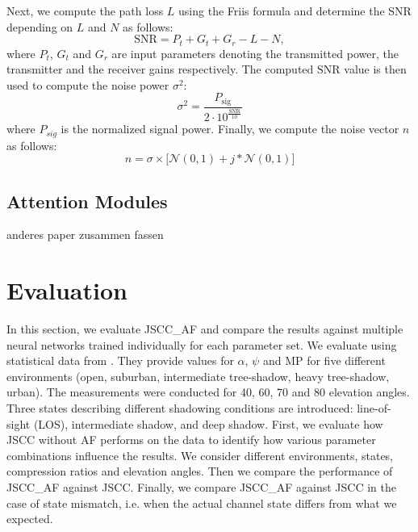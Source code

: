 \documentclass[conference]{IEEEtran}
\begin{document}
Next, we compute the path loss $L$ using the Friis formula \cite{} and determine the SNR depending on $L$ and $N$ as follows:
%
\begin{equation}
  \mathrm{SNR} = P_t + G_t + G_r - L - N,
\end{equation}
%
where $P_t$, $G_t$ and $G_r$ are input parameters denoting the transmitted power, the transmitter and the receiver gains respectively. 
The computed $\mathrm{SNR}$ value is then used to compute the noise power $\sigma^2$:
%
\begin{equation}
  \sigma^2 = \frac{P_{\mathrm{sig}}}{2 \cdot 10^{\frac{\mathrm{SNR}}{10}}}
\end{equation}
%
where $P_{sig}$ is the normalized signal power.
Finally, we compute the noise vector $n$ as follows:
%
\begin{equation}
  n = \sigma \times \bigl[\mathcal{N}(0,1) + j * \mathcal{N}(0,1) \bigr] 
\end{equation}
%


\subsection{Attention Modules}

anderes paper zusammen fassen

\section{Evaluation}
\label{sec:evaluation}
In this section, we evaluate JSCC\_AF and compare the results against multiple neural networks trained individually for each parameter set.
We evaluate using statistical data from \cite{channel_values}. 
They provide values for $\alpha$, $\psi$ and MP for five different environments (open, suburban, intermediate tree-shadow, heavy tree-shadow, urban).
The measurements were conducted for 40, 60, 70 and 80 elevation angles.
Three states describing different shadowing conditions are introduced: line-of-sight (LOS), intermediate shadow, and deep shadow.
First, we evaluate how JSCC without AF performs on the data to identify how various parameter combinations influence the results.
We consider different environments, states, compression ratios and elevation angles. 
Then we compare the performance of JSCC\_AF against JSCC.
Finally, we compare JSCC\_AF against JSCC in the case of state mismatch, i.e. when the actual channel state differs from what we expected.
\end{document}
